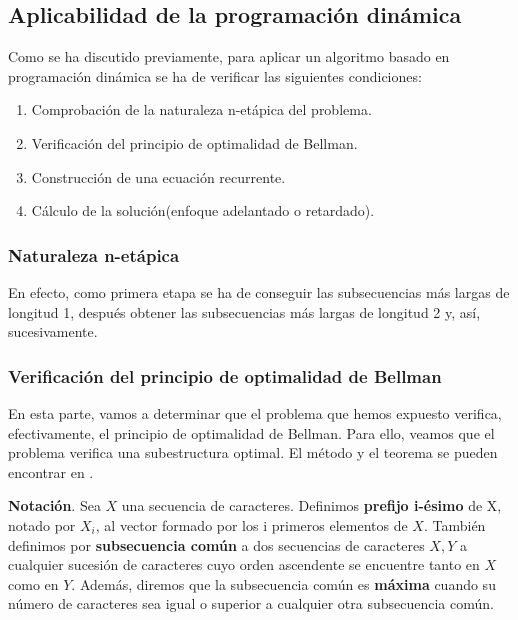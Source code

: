 \subsection{Aplicabilidad de la programación dinámica}

Como se ha discutido previamente, para aplicar un algoritmo basado en programación
dinámica se ha de verificar las siguientes condiciones:

\begin{enumerate}
    \item Comprobación de la naturaleza n-etápica del problema. 
    \item Verificación del principio de optimalidad de Bellman. 
    \item Construcción de una ecuación recurrente. 
    \item Cálculo de la solución(enfoque adelantado o retardado). 
\end{enumerate}

\subsubsection{Naturaleza n-etápica}
En efecto, 
como primera etapa se ha de conseguir las subsecuencias más largas de longitud 1, 
después obtener las subsecuencias más largas de longitud 2 y, así, sucesivamente. 


\subsubsection{Verificación del principio de optimalidad de Bellman}

En esta parte, vamos a determinar que el problema que hemos expuesto verifica,
efectivamente, el principio de optimalidad de Bellman. Para ello, veamos que el
problema verifica una subestructura optimal. El método y el teorema se pueden encontrar
en \cite{Cormen2017}. 

\textbf{Notación}. Sea $X$ una secuencia de caracteres. Definimos \textbf{prefijo i-ésimo}
de X, notado por $X_i$, al vector formado por los i primeros elementos de $X$. 
También definimos por \textbf{subsecuencia común} a dos secuencias de caracteres $X,Y$ a cualquier sucesión de caracteres
cuyo orden ascendente se encuentre tanto en $X$ como en $Y$. Además, diremos que la
subsecuencia común es \textbf{máxima} cuando su número de caracteres sea igual o superior 
a cualquier otra subsecuencia común. 

